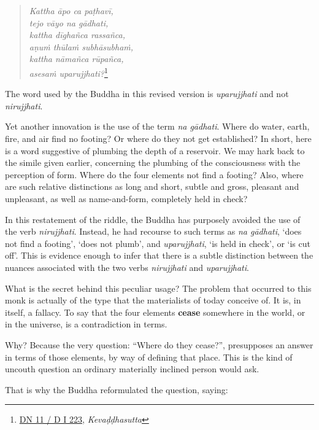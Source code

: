 \clearpage

\begin{quote}
\emph{Kattha āpo ca paṭhavī,}\\
\emph{tejo vāyo na gādhati,}\\
\emph{kattha dīghañca rassañca,}\\
\emph{aṇuṁ thūlaṁ subhāsubhaṁ,}\\
\emph{kattha nāmañca rūpañca,}\\
\emph{asesaṁ uparujjhati?}\footnote{\href{https://suttacentral.net/dn11/pli/ms}{DN 11 / D I 223}, \emph{Kevaḍḍhasutta}}
\end{quote}

The word used by the Buddha in this revised version is \emph{uparujjhati} and not \emph{nirujjhati}.

Yet another innovation is the use of the term \emph{na gādhati}. Where do water, earth, fire, and air find no footing? Or where do they not get established? In short, here is a word suggestive of plumbing the depth of a reservoir. We may hark back to the simile given earlier, concerning the plumbing of the consciousness with the perception of form. Where do the four elements not find a footing? Also, where are such relative distinctions as long and short, subtle and gross, pleasant and unpleasant, as well as name-and-form, completely held in check?

In this restatement of the riddle, the Buddha has purposely avoided the use of the verb \emph{nirujjhati}. Instead, he had recourse to such terms as \emph{na gādhati}, `does not find a footing', `does not plumb', and \emph{uparujjhati}, `is held in check', or `is cut off'. This is evidence enough to infer that there is a subtle distinction between the nuances associated with the two verbs \emph{nirujjhati} and \emph{uparujjhati}.

What is the secret behind this peculiar usage? The problem that occurred to this monk is actually of the type that the materialists of today conceive of. It is, in itself, a fallacy. To say that the four elements \textbf{cease} somewhere in the world, or in the universe, is a contradiction in terms.

Why? Because the very question: ``Where do they cease?'', presupposes an answer in terms of those elements, by way of defining that place. This is the kind of uncouth question an ordinary materially inclined person would ask.

That is why the Buddha reformulated the question, saying:

